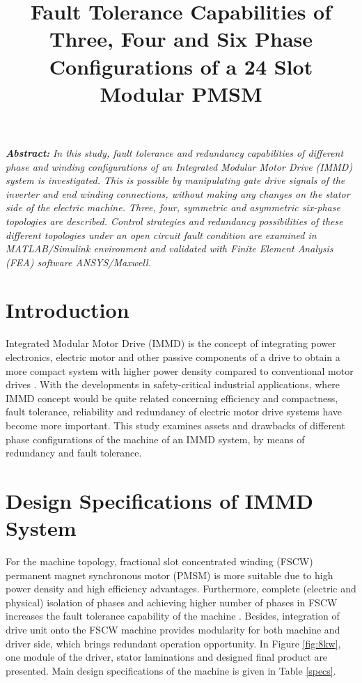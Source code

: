 \documentclass[a4paper,11pt]{article}
\title{\normalsize\textbf{Fault Tolerance Capabilities of Three, Four and Six Phase Configurations of a 24 Slot Modular PMSM}}
\date{}
\begin{document}
\vspace{-45mm}
\maketitle
\vspace{-23mm}

\textit{\normalsize\textbf{Abstract:}}
\textit{In this study, fault tolerance and redundancy capabilities of different phase and winding configurations of an Integrated Modular Motor Drive (IMMD) system is investigated. This is possible by manipulating gate drive signals of the inverter and end winding connections, without making any changes on the stator side of the electric machine. Three, four, symmetric and asymmetric six-phase topologies are described. Control strategies and redundancy possibilities of these different topologies under an open circuit fault condition are examined in MATLAB/Simulink environment and validated with Finite Element Analysis (FEA) software ANSYS/Maxwell. }

\section{\normalsize\textbf{Introduction}}
Integrated Modular Motor Drive (IMMD) is the concept of integrating power electronics, electric motor and other passive components of a drive to obtain a more compact system with higher power density compared to conventional motor drives \cite{immd-bible}. With the developments in safety-critical industrial applications, where IMMD concept would be quite related concerning efficiency and compactness, fault tolerance, reliability and redundancy of electric motor drive systems have become more important. This study examines assets and drawbacks of different phase configurations of the machine of an IMMD system, by means of redundancy and fault tolerance. 

\section{\normalsize\textbf{Design Specifications of IMMD System}}
For the machine topology, fractional slot concentrated winding (FSCW) permanent magnet synchronous motor (PMSM) is more suitable due to high power density and high efficiency advantages. Furthermore, complete (electric and physical) isolation of phases and achieving higher number of phases in FSCW increases the fault tolerance capability of the machine \cite{fscw}. Besides, integration of drive unit onto the FSCW machine \cite{mesutto} provides modularity for both machine and driver side, which brings redundant operation opportunity. In Figure \ref{fig:8kw}, one module of the driver, stator laminations and designed final product are presented. Main design specifications of the machine is given in Table \ref{specs}.
\end{document}
